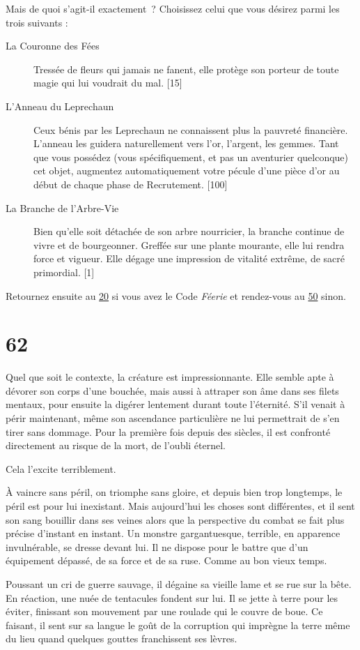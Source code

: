 \documentclass{report}
\newcommand{\gsection}[1]{
    \section{#1}
    \label{section-#1}
}
\newcommand{\glink}[1]{\hyperref[section-#1]{#1}}
\begin{document}
Mais de quoi s'agit-il exactement ? Choisissez celui que vous désirez parmi les trois suivants :

\begin{description}
\item[La Couronne des Fées] Tressée de fleurs qui jamais ne fanent, elle protège son porteur de toute magie qui lui voudrait du mal. [15]
\item[L'Anneau du Leprechaun] Ceux bénis par les Leprechaun ne connaissent plus la pauvreté financière. L'anneau les guidera naturellement vers l'or, l'argent, les gemmes. Tant que vous possédez (vous spécifiquement, et pas un aventurier quelconque) cet objet, augmentez automatiquement votre pécule d'une pièce d'or au début de chaque phase de Recrutement. [100]
\item[La Branche de l'Arbre-Vie] Bien qu'elle soit détachée de son arbre nourricier, la branche continue de vivre et de bourgeonner. Greffée sur une plante mourante, elle lui rendra force et vigueur. Elle dégage une impression de vitalité extrême, de sacré primordial. [1]
\end{description}

Retournez ensuite au \glink{20} si vous avez le Code \emph{Féerie} et rendez-vous au \glink{50} sinon.

\gsection{62}

Quel que soit le contexte, la créature est impressionnante. Elle semble apte à dévorer son corps d'une bouchée, mais aussi à attraper son âme dans ses filets mentaux, pour ensuite la digérer lentement durant toute l'éternité. S'il venait à périr maintenant, même son ascendance particulière ne lui permettrait de s'en tirer sans dommage. Pour la première fois depuis des siècles, il est confronté directement au risque de la mort, de l'oubli éternel.

Cela l'excite terriblement.

À vaincre sans péril, on triomphe sans gloire, et depuis bien trop longtemps, le péril est pour lui inexistant. Mais aujourd'hui les choses sont différentes, et il sent son sang bouillir dans ses veines alors que la perspective du combat se fait plus précise d'instant en instant. Un monstre gargantuesque, terrible, en apparence invulnérable, se dresse devant lui. Il ne dispose pour le battre que d'un équipement dépassé, de sa force et de sa ruse. Comme au bon vieux temps.

Poussant un cri de guerre sauvage, il dégaine sa vieille lame et se rue sur la bête. En réaction, une nuée de tentacules fondent sur lui. Il se jette à terre pour les éviter, finissant son mouvement par une roulade qui le couvre de boue. Ce faisant, il sent sur sa langue le goût de la corruption qui imprègne la terre même du lieu quand quelques gouttes franchissent ses lèvres.
\end{document}
